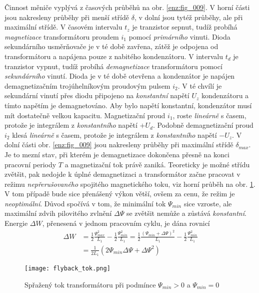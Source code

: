  Činnost měniče vyplývá z časových průběhů na obr. \ref{enz:fig_009}. V horní části jsou 
  nakresleny průběhy při menší střídě \(\delta\), v dolní jsou tytéž průběhy, ale při maximální 
  střídě. V časovém intervalu \(t_z\) je tranzistor sepnut, tudíž probíhá \emph{magnetizace} 
  transformátoru proudem \(i_1\) pomocí \emph{primárního} vinuti. Dioda sekundárního usměrňovače 
  je v té době zavřena, zátěž je odpojena od transformátoru a napájena pouze z nabitého 
  kondenzátoru. V intervalu \(t_d\) je tranzistor vypnut, tudíž probíhá \emph{demagnetizace} 
  transformátoru pomocí \emph{sekundárního} vinutí. Dioda je v té době otevřena a kondenzátor je 
  napájen demagnetizačním trojúhelníkovým proudovým pulsem \(i_2\). V té chvílí je sekundární 
  vinutí přes diodu připojeno na \emph{konstantní} napětí \(U_z\) kondenzátoru a tímto napětím je 
  demagnetováno. Aby bylo napětí konstantní, kondenzátor musí mít dostatečně velkou kapacitu. 
  Magnetizační proud \(i_1\), roste \emph{lineárně} s časem, protože je integrálem z 
  \emph{konstantního} napětí \(+U_d\). Podobně demagnetizační proud \(i_2\) klesá \emph{lineárně} 
  s časem, protože je integrálem z \emph{konstantního} napětí \(-U_z\). V dolní části obr. 
  \ref{enz:fig_009} jsou nakresleny průběhy při maximální střídě \(\delta_{max}\). Je to mezní 
  stav, při kterém je demagnetizace dokončena přesně na konci pracovní periody \(T\) a 
  magnetizační tok právě zaniká. Teoreticky je možné střídu zvětšit, pak nedojde k úplné 
  demagnetizaci a transformátor začne pracovat v režimu \emph{nepřerušovaného} spojitého 
  magnetického toku, viz horní průběh na obr. \ref{enz:fig_010}. V tom případě bude sice 
  přenášený výkon větší, ovšem za cenu, že režim je \emph{neoptimální}. Důvod spočívá v tom, že 
  minimální tok \(\Psi_{min}\) sice vzroste, ale maximální zdvih pilovitého zvlnění 
  \(\Delta\Psi\) se zvětšit nemůže a zůstává \emph{konstantní}. Energie \(\Delta W\), přenesená v 
  jednom pracovním cyklu, je dána rovnicí
  \begin{align}
    \Delta W 
      &= \frac{1}{2}\frac{\Psi_{max}^2}{L_1} 
       - \frac{1}{2}\frac{\Psi_{min}^2}{L_1}   
       = \frac{1}{2}\frac{(\Psi_{min}+\Delta\Psi)^2}{L_1} 
       - \frac{1}{2}\frac{\Psi_{min}^2}{L_1}   \nonumber \\
      &= \frac{1}{2L_1}\left(2\Psi_{min}\Delta\Psi+\Delta\Psi^2\right) \label{ENZ:eq_001}
  \end{align}
  
  \begin{figure}[ht!]
    \centering
    \texttt{[image: flyback\_tok.png]}
    \caption{Spřažený tok transformátoru při podmínce \(\Psi_{min}>0\) a \(\Psi_{min}=0\)}
    \label{enz:fig_010}
  \end{figure} 
  

